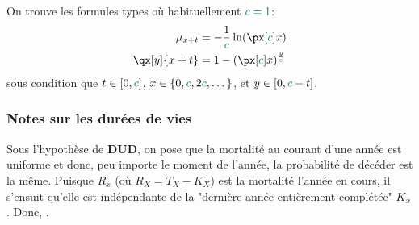 \documentclass[10pt, french]{article}
\begin{document}
\begin{multicols*}{3}
On trouve les formules types où habituellement $\textcolor{teal}{\textcolor{teal}{c} = 1}$:
\begin{align*}
	\mu_{x + t} 
	&=	-\frac{1}{\textcolor{teal}{c}} \ln(\px[\textcolor{teal}{c}]{x})	\\
	\qx[y]{x + t} 
	&=	1 - (\px[\textcolor{teal}{c}]{x})^{\frac{y}{\textcolor{teal}{c}}}	\\
\end{align*}
sous condition que $t \in[0, \textcolor{teal}{c}]$, $x \in \{0, \textcolor{teal}{c}, 2\textcolor{teal}{c}, \dots\}$, et $y \in [0, \textcolor{teal}{c} - t]$.



\subsubsection*{Notes sur les durées de vies}
Sous l'hypothèse de \textbf{DUD}, on pose que la mortalité au courant d'une année est uniforme et donc, peu importe le moment de l'année, la probabilité de décéder est la même. Puisque $R_{x}$ (où $R_{X} = T_{X} - K_{X}$) est la mortalité l'année en cours, il s'ensuit qu'elle est indépendante de la "dernière année entièrement complétée" $K_{x}$. Donc, .


\end{multicols*}
\end{document}
